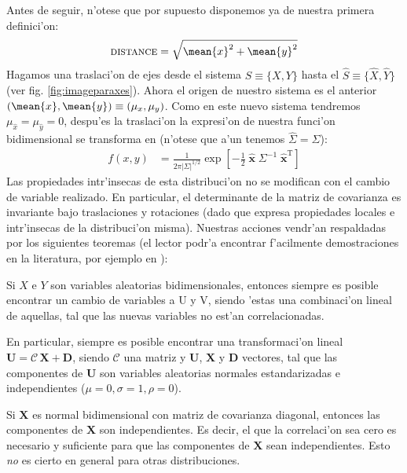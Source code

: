 Antes de seguir, n'otese que por supuesto disponemos ya de nuestra
primera definici'on:
%
\begin{equation}
  \label{eq:distance}
  \text{\scshape distance} = \sqrt{\mean{x}^2 + \mean{y}^2}
\end{equation}
%
Hagamos una traslaci'on de ejes desde el sistema $S\equiv\{X,Y\}$
hasta el $\hat{S}\equiv\{\hat{X},\hat{Y}\}$ (ver fig.
\ref{fig:imageparaxes}). Ahora el origen de nuestro sistema es el
anterior $(\mean{x}, \mean{y})\equiv(\mu_x, \mu_y)$.  Como en este
nuevo sistema tendremos $\mu_{\hat{x}} = \mu_{\hat{y}} = 0$, despu'es
la traslaci'on la expresi'on de nuestra funci'on bidimensional se
transforma en (n'otese que a'un tenemos $\hat{\Sigma} = \Sigma$):
%
\begin{align}
  \label{eq:gauss2dvechat}
  f(x,y)  &=  \frac{1}{2\pi|\Sigma|^{1/2}} 
  \exp\left[ -\frac{1}{2} \;
    \hat{\mathbf{x}} \; \Sigma^{-1} \; \hat{\mathbf{x}}^{\mathrm{T}}
  \right]
\end{align}
%
Las propiedades intr'insecas de esta distribuci'on no se modifican con
el cambio de variable realizado. En particular, el determinante de la
matriz de covarianza es invariante bajo traslaciones y rotaciones
(dado que expresa propiedades locales e intr'insecas de la
distribuci'on misma). Nuestras acciones vendr'an respaldadas por los
siguientes teoremas (el lector podr'a encontrar f'acilmente
demostraciones en la literatura, por ejemplo en \cite{}):

\begin{Theo}
  Si $X$ e $Y$ son variables aleatorias bidimensionales, entonces
  siempre es posible encontrar un cambio de variables a U y V, siendo
  'estas una combinaci'on lineal de aquellas, tal que las nuevas
  variables no est'an correlacionadas.
\end{Theo}

\begin{Theo}
  En particular, siempre es posible encontrar una transformaci'on
  lineal $\mathbf{U}=\mathcal{C}\,\mathbf{X}+\mathbf{D}$, siendo
  $\mathcal{C}$ una matriz y $\mathbf{U}$, $\mathbf{X}$ y $\mathbf{D}$
  vectores, tal que las componentes de $\mathbf{U}$ son variables
  aleatorias normales estandarizadas e independientes
  ($\mu=0,\sigma=1,\rho=0$).
\end{Theo}

\begin{Theo}
  Si $\mathbf{X}$ es normal bidimensional con matriz de covarianza
  diagonal, entonces las componentes de $\mathbf{X}$ son
  independientes. Es decir, el que la correlaci'on sea cero es
  necesario y suficiente para que las componentes de $\mathbf{X}$ sean
  independientes. Esto \emph{no} es cierto en general para otras
  distribuciones.
\end{Theo}

